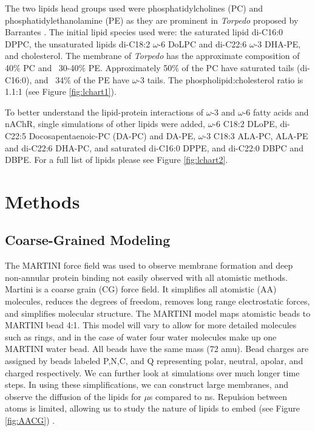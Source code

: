 \documentclass[10pt, letterpaper]{article}
\begin{document}
The two lipids head groups used were phosphatidylcholines (PC) and phosphatidylethanolamine (PE) as they are prominent in \textit{Torpedo} proposed by Barrantes \cite{barrantesthe1989}. The initial lipid species used were: the saturated lipid di-C16:0 DPPC, the unsaturated lipids di-C18:2 $\omega$-6 DoLPC and di-C22:6 $\omega$-3 DHA-PE, and cholesterol. The membrane of \textit{Torpedo} has the approximate composition of 40$\%$ PC and ~30-40$\%$ PE. Approximately 50$\%$ of the PC have saturated tails (di-C16:0), and ~34$\%$ of the PE have $\omega$-3 tails. The phospholipid:cholesterol ratio is 1.1:1 (see Figure \ref{fig:lchart1}).

To better understand the lipid-protein interactions of $\omega$-3 and $\omega$-6 fatty acids and nAChR, single simulations of other lipids were added, $\omega$-6 C18:2 DLoPE, di-C22:5 Docosapentaenoic-PC (DA-PC) and DA-PE, $\omega$-3 C18:3 ALA-PC, ALA-PE and di-C22:6 DHA-PC, and saturated di-C16:0 DPPE, and di-C22:0 DBPC and DBPE. For a full list of lipids please see Figure \ref{fig:lchart2}.
\newpage
\section{Methods}

\subsection{Coarse-Grained Modeling}

The MARTINI force field was used to observe membrane formation and deep non-annular protein binding not easily observed with all atomistic methods. Martini is a coarse grain (CG) force field. It simplifies all atomistic (AA) molecules, reduces the degrees of freedom, removes long range electrostatic forces, and simplifies molecular structure. The MARTINI model maps atomistic beads to MARTINI bead 4:1. This model will vary to allow for more detailed molecules such as rings, and in the case of water four water molecules make up one MARTINI water bead. All beads have the same mass (72 amu). Bead charges are assigned by beads labeled P,N,C, and Q representing polar, neutral, apolar, and charged respectively. We can further look at simulations over much longer time steps. In using these simplifications, we can construct large membranes, and observe the diffusion of the lipids for $\mu$s compared to ns. Repulsion between atoms is limited, allowing us to study the nature of lipids to embed (see Figure \ref{fig:AACG}) \cite{jongimproved2013}. 
\end{document}
